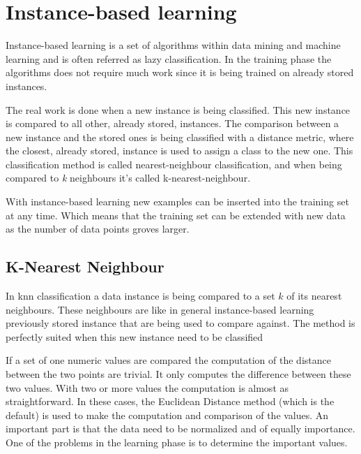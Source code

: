 \section{Instance-based learning}\label{sec:theoryInstanceLearning}
Instance-based learning is a set of algorithms within data mining and machine learning and is often referred as lazy classification.
In the training phase the algorithms does not require much work since it is being trained on already stored instances.
\cite[p. 78]{DataMiningPractical2011} 

\bigskip

The real work is done when a new instance is being classified.
This new instance is compared to all other, already stored, instances. 
The comparison between a new instance and the stored ones is being classified with a distance metric, where the closest, already stored, instance is used to assign a class to the new one.
This classification method is called nearest-neighbour classification, and when being compared to \textit{k} neighbours it's called k-nearest-neighbour.
\cite[p. 78]{DataMiningPractical2011} 

\bigskip

With instance-based learning new examples can be inserted into the training set at any time.
Which means that the training set can be extended with new data as the number of data points groves larger.
\cite[p. 135]{DataMiningPractical2011} 


\subsection{K-Nearest Neighbour}\label{sec:theoryUnClassKnn}
In \acrfull{knn} classification a data instance is being compared to a set $k$ of its nearest neighbours.
These neighbours are like in general instance-based learning previously stored instance that are being used to compare against.
The method is perfectly suited when this new instance need to be classified \cite[p. 77-79]{DataMiningPractical2011}

\bigskip

If a set of one numeric values are compared the computation of the distance between the two points are trivial. 
It only computes the difference between these two values.
With two or more values the computation is almost as straightforward.
In these cases, the Euclidean Distance method (which is the default) is used to make the computation and comparison of the values.
An important part is that the data need to be normalized and of equally importance.
One of the problems in the learning phase is to determine the important values.
\cite[p. 77-79]{DataMiningPractical2011}

